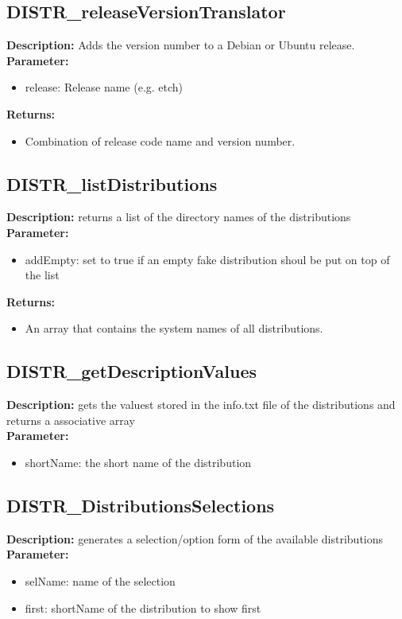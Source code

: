 \subsection{DISTR\_releaseVersionTranslator}
\textbf{Description:} Adds the version number to a Debian or Ubuntu release.\\
\textbf{Parameter:}
\begin{itemize}
\item release: Release name (e.g. etch)
\end{itemize}
\textbf{Returns:}
\begin{itemize}
\item Combination of release code name and version number.
\end{itemize}

\subsection{DISTR\_listDistributions}
\textbf{Description:} returns a list of the directory names of the distributions\\
\textbf{Parameter:}
\begin{itemize}
\item addEmpty: set to true if an empty fake distribution shoul be put on top of the list
\end{itemize}
\textbf{Returns:}
\begin{itemize}
\item An array that contains the system names of all distributions.
\end{itemize}

\subsection{DISTR\_getDescriptionValues}
\textbf{Description:} gets the valuest stored in the info.txt file of the distributions and returns a associative array\\
\textbf{Parameter:}
\begin{itemize}
\item shortName: the short name of the distribution
\end{itemize}

\subsection{DISTR\_DistributionsSelections}
\textbf{Description:} generates a selection/option form of the available distributions\\
\textbf{Parameter:}
\begin{itemize}
\item selName: name of the selection
\item first: shortName of the distribution to show first
\end{itemize}

